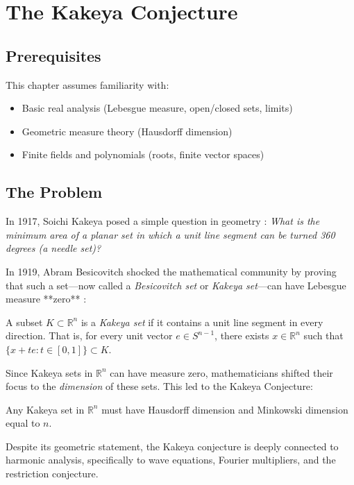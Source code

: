 \let\LocalMacro\relax

\chapter{The Kakeya Conjecture}

\section{Prerequisites}
This chapter assumes familiarity with:
\begin{itemize}
\item Basic real analysis (Lebesgue measure, open/closed sets, limits)
\item Geometric measure theory (Hausdorff dimension)
\item Finite fields and polynomials (roots, finite vector spaces)
\end{itemize}

\section{The Problem}
In 1917, Soichi Kakeya posed a simple question in geometry \cite{kakeya1917}: \emph{What is the minimum area of a planar set in which a unit line segment can be turned 360 degrees (a needle set)?}

In 1919, Abram Besicovitch shocked the mathematical community by proving that such a set—now called a \emph{Besicovitch set} or \emph{Kakeya set}—can have Lebesgue measure **zero** \cite{besicovitch1919}:

\begin{definition}
A subset $K \subset \mathbb{R}^n$ is a \emph{Kakeya set} if it contains a unit line segment in every direction. That is, for every unit vector $e \in S^{n-1}$, there exists $x \in \mathbb{R}^n$ such that $\{x + t e : t \in [0, 1]\} \subset K$.
\end{definition}

Since Kakeya sets in $\mathbb{R}^n$ can have measure zero, mathematicians shifted their focus to the \emph{dimension} of these sets. This led to the Kakeya Conjecture:

\begin{conjecture}
Any Kakeya set in $\mathbb{R}^n$ must have Hausdorff dimension and Minkowski dimension equal to $n$.
\end{conjecture}

Despite its geometric statement, the Kakeya conjecture is deeply connected to harmonic analysis, specifically to wave equations, Fourier multipliers, and the restriction conjecture.

